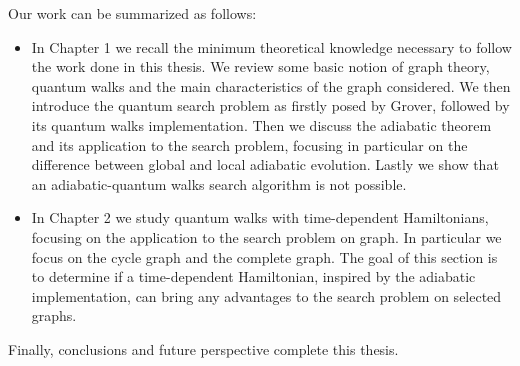 \noindent
Our work can be summarized as follows:
\begin{itemize}
  \item In Chapter 1  we recall the minimum theoretical knowledge necessary to follow the work done in this thesis. We review some basic notion of graph theory, quantum walks and the main characteristics of the graph considered. We then introduce the quantum search problem as firstly posed by Grover, followed by its quantum walks implementation. Then we discuss the adiabatic theorem and its application to the search problem, focusing in particular on the difference between global and local adiabatic evolution. Lastly we show that an adiabatic-quantum walks search algorithm is not possible.

  \item In Chapter 2 we study quantum walks with time-dependent Hamiltonians, focusing on the application to the search problem on graph. In particular we focus on the cycle graph and the complete graph. The goal of this section is to determine if a time-dependent Hamiltonian, inspired by the adiabatic implementation, can bring any advantages to the search problem on selected graphs.


\end{itemize}
Finally, conclusions and future perspective complete this thesis.
